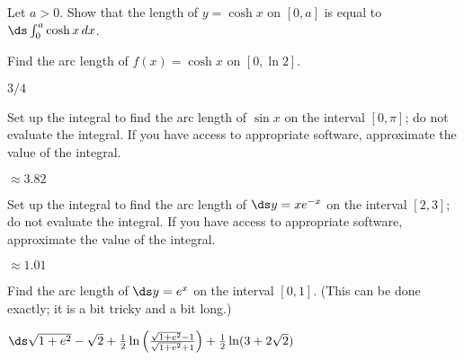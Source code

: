 \begin{enumialphparenastyle}
\begin{ex}
 Let $a>0$. Show that the length of $y=\cosh x$ on
$[0,a]$ is equal to $\ds \int _0 ^a \cosh x\,dx$.
\end{ex}

\begin{ex}
 Find the arc length of $f(x)=\cosh x$ on $[0, \ln 2]$.
\begin{sol}
 $3/4$
\end{sol}
\end{ex}

\begin{ex}
 Set up the integral to find the arc length of $\sin x$ 
on the interval $[0,\pi]$; do not evaluate the integral. If you have
access to appropriate software, approximate the value of the integral.
\begin{sol}
 $\approx 3.82$
\end{sol}
\end{ex}

\begin{ex}
 Set up the integral to find the arc length of $\ds y=xe^{-x}$
on the interval $[2,3]$; do not evaluate the integral. If you have
access to appropriate software, approximate the value of the integral.
\begin{sol}
 $\approx 1.01$
\end{sol}
\end{ex}

\begin{ex}
 Find the arc length of $\ds y=e^x$ on the interval $[0,1]$.
(This can be done exactly; it is a bit tricky and a bit long.)
\begin{sol}
 $\ds \sqrt{1+e^2}-\sqrt2+
{1\over2}\ln\left({\sqrt{1+e^2}-1\over\sqrt{1+e^2}+1}\right)+
{1\over2}\ln(3+2\sqrt2)$
\end{sol}
\end{ex}

\end{enumialphparenastyle}